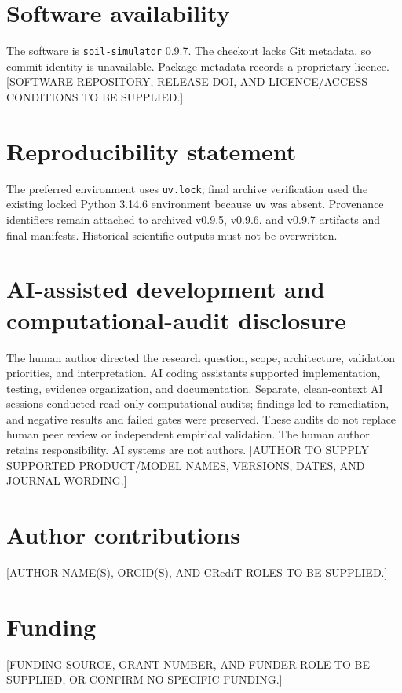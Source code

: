 \documentclass[11pt]{article}
\begin{document}
\section{Software availability}

The software is \texttt{soil-simulator} 0.9.7. The checkout lacks Git metadata, so commit identity is unavailable. Package metadata records a proprietary licence. [SOFTWARE REPOSITORY, RELEASE DOI, AND LICENCE/ACCESS CONDITIONS TO BE SUPPLIED.]

\section{Reproducibility statement}

The preferred environment uses \texttt{uv.lock}; final archive verification used the existing locked Python 3.14.6 environment because \texttt{uv} was absent. Provenance identifiers remain attached to archived v0.9.5, v0.9.6, and v0.9.7 artifacts and final manifests. Historical scientific outputs must not be overwritten.

\section{AI-assisted development and computational-audit disclosure}

The human author directed the research question, scope, architecture, validation priorities, and interpretation. AI coding assistants supported implementation, testing, evidence organization, and documentation. Separate, clean-context AI sessions conducted read-only computational audits; findings led to remediation, and negative results and failed gates were preserved. These audits do not replace human peer review or independent empirical validation. The human author retains responsibility. AI systems are not authors. [AUTHOR TO SUPPLY SUPPORTED PRODUCT/MODEL NAMES, VERSIONS, DATES, AND JOURNAL WORDING.]

\section{Author contributions}
[AUTHOR NAME(S), ORCID(S), AND CRediT ROLES TO BE SUPPLIED.]

\section{Funding}
[FUNDING SOURCE, GRANT NUMBER, AND FUNDER ROLE TO BE SUPPLIED, OR CONFIRM NO SPECIFIC FUNDING.]
\end{document}

